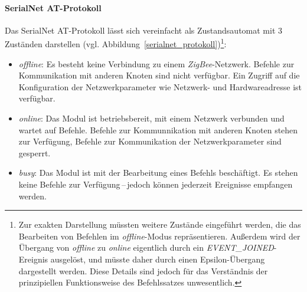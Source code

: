            \paragraph{SerialNet AT-Protokoll}


                Das SerialNet AT-Protokoll lässt sich vereinfacht als Zustandsautomat mit 3 Zuständen darstellen
                (vgl. Abbildung~\ref{serialnet_protokoll})\footnote{Zur exakten Darstellung müssten weitere 
                    Zustände eingeführt werden, die das Bearbeiten von Befehlen im \emph{offline}-Modus repräsentieren. 
                    Außerdem wird der Übergang von \emph{offline} zu \emph{online} eigentlich durch ein 
                    \emph{EVENT\_JOINED}-Ereignis ausgelöst, und müsste daher durch einen Epsilon-Übergang dargestellt
                    werden. Diese Details sind jedoch für das Verständnis der prinzipiellen Funktionsweise des 
                    Befehlssatzes unwesentlich.}:

                \begin{itemize}
                    \item{\emph{offline}:} Es besteht keine Verbindung zu einem \emph{ZigBee}-Netzwerk. Befehle
                                    zur Kommunikation mit anderen Knoten sind nicht verfügbar. 
                                    Ein Zugriff auf die Konfiguration der Netzwerkparameter wie 
                                    Netzwerk- und Hardwareadresse ist verfügbar. 

                    \item{\emph{online}:} Das Modul ist betriebsbereit, mit einem Netzwerk verbunden und wartet
                                   auf Befehle. Befehle zur Kommunnikation mit anderen Knoten stehen zur
                                   Verfügung, Befehle zur Kommunikation der Netzwerkparameter sind gesperrt.

                    \item{\emph{busy}:} Das Modul ist mit der Bearbeitung eines Befehls beschäftigt. Es stehen
                                 keine Befehle zur Verfügung\,--\,jedoch können jederzeit Ereignisse 
                                 empfangen werden.
                \end{itemize}
                                    
